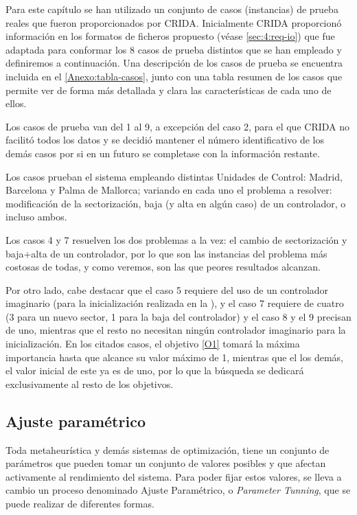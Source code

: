 Para este capítulo se han utilizado un conjunto de casos (instancias) de prueba reales que fueron proporcionados por CRIDA. Inicialmente CRIDA proporcionó información en los formatos de ficheros propuesto (véase \autoref{sec:4:req-io}) que fue adaptada para conformar los 8 casos de prueba distintos que se han empleado y definiremos a continuación. Una descripción de los casos de prueba se encuentra incluida en el \autoref{Anexo:tabla-casos}, junto con una tabla resumen de los casos que permite ver de forma más detallada y clara las características de cada uno de ellos.

Los casos de prueba van del 1 al 9, a excepción del caso 2, para el que \gls{CRIDA} no facilitó todos los datos y se decidió mantener el número identificativo de los demás casos por si en un futuro se completase con la información restante.

Los casos prueban el sistema empleando distintas Unidades de Control: Madrid, Barcelona y Palma de Mallorca; variando en cada uno el problema a resolver: modificación de la sectorización, baja (y alta en algún caso) de un controlador, o incluso ambos.

Los casos 4 y 7 resuelven los dos problemas a la vez: el cambio de sectorización y baja+alta de un controlador, por lo que son las instancias del problema más costosas de todas, y como veremos, son las que peores resultados alcanzan. %

Por otro lado, cabe destacar que el caso 5 requiere del uso de un controlador imaginario (para la inicialización realizada en la \faseuno{}), y el caso 7 requiere de cuatro (3 para un nuevo sector, 1 para la baja del controlador) y el caso 8 y el 9 precisan de uno, mientras que el resto no necesitan ningún controlador imaginario para la inicialización. En los citados casos, el objetivo \ref{O1} tomará la máxima importancia hasta que alcance su valor máximo de 1, mientras que el los demás, el valor inicial de este ya es de uno, por lo que la búsqueda se dedicará exclusivamente al resto de los objetivos.

\subsection{Ajuste paramétrico}
Toda metaheurística y demás sistemas de optimización, tiene un conjunto de parámetros que pueden tomar un conjunto de valores posibles y que afectan activamente al rendimiento del sistema. Para poder fijar estos valores, se lleva a cambio un proceso denominado Ajuste Paramétrico, o \textit{Parameter Tunning}, que se puede realizar de diferentes formas.

